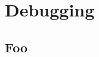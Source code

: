 \documentclass[serif,xcolor=pdftex,dvipsnames,table,hyperref={bookmarks=false,breaklinks}]{beamer}
\begin{document}
\maketitlepage

%
%
%
%

\section{Debugging}
\subsection{Foo}
\end{document}
